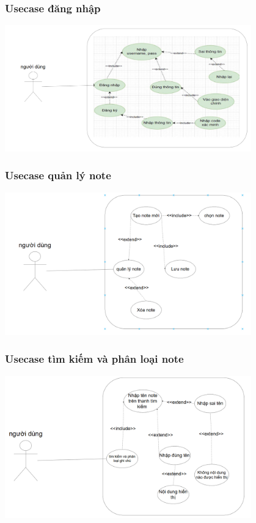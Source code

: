 \documentclass[a4paper,12pt]{article}
\begin{document}
\subsubsection{Usecase đăng nhập}
\includegraphics[width=0.8\textwidth]{useCaseDangNhap.png}

\clearpage

\subsubsection{Usecase quản lý note}
\includegraphics[width=0.8\textwidth]{useCasequanly.png}
\subsubsection{Usecase tìm kiếm và phân loại note}
\includegraphics[width=0.8\textwidth]{useCasetimkiem.png}
\end{document}
